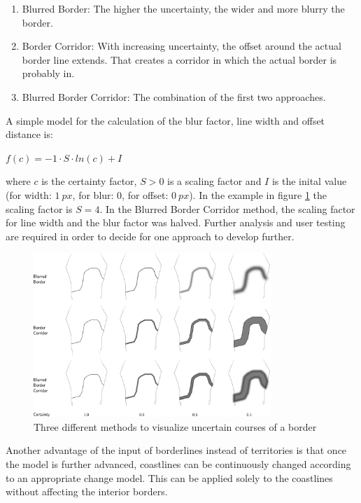 \begin{enumerate}
  \item Blurred Border: The higher the uncertainty, the wider and more blurry the border.
  \item Border Corridor: With increasing uncertainty, the offset around the actual border line extends. That creates a corridor in which the actual border is probably in.
  \item Blurred Border Corridor: The combination of the first two approaches.
\end{enumerate}

A simple model for the calculation of the blur factor, line width and offset distance is:
\begin{center}
\begin{math}
    f(c) = -1 \cdot S \cdot ln(c) + I
\end{math}
\end{center}
where $c$ is the certainty factor, $S>0$ is a scaling factor and $I$ is the inital value (for width: $1~px$, for blur: $0$, for offset: $0~px$). In the example in figure \ref{fig:uncertainty_border} the scaling factor is $S=4$. In the Blurred Border Corridor method, the scaling factor for line width and the blur factor was halved. Further analysis and user testing are required in order to decide for one approach to develop further.

\begin{figure}[ht]
  \vspace{1em}
  \centering
  \includegraphics[width = 0.8\textwidth]{graphics/extensions/border}
  \caption{Three different methods to visualize uncertain courses of a border}
  \label{fig:uncertainty_border}
\end{figure}

Another advantage of the input of borderlines instead of territories is that once the model is further advanced, coastlines can be continuously changed according to an appropriate change model. This can be applied solely to the coastlines without affecting the interior borders.

